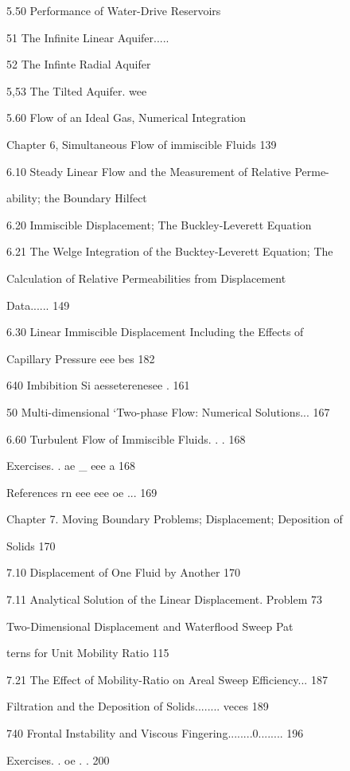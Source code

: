 \documentclass[
  11pt,
]{article}
\begin{document}
5.50 Performance of Water-Drive Reservoirs\par
51 The Infinite Linear Aquifer.....\par
52 The Infinte Radial Aquifer\par
5,53 The Tilted Aquifer. wee\par
5.60 Flow of an Ideal Gas, Numerical Integration\par
\smallskip
Chapter 6, Simultaneous Flow of immiscible Fluids 139\par
6.10 Steady Linear Flow and the Measurement of Relative Perme-\par
ability; the Boundary Hilfect\par
6.20 Immiscible Displacement; The Buckley-Leverett Equation\par
6.21 The Welge Integration of the Bucktey-Leverett Equation; The\par
Calculation of Relative Permeabilities from Displacement\par
\smallskip
Data...... 149\par
6.30 Linear Immiscible Displacement Including the Effects of\par
Capillary Pressure eee bes 182\par
640 Imbibition Si aesseterenesee . 161\par
50 Multi-dimensional `Two-phase Flow: Numerical Solutions... 167\par
6.60 Turbulent Flow of Immiscible Fluids. . . 168\par
Exercises. . ae \_ eee a 168\par
References rn eee eee oe ... 169\par
Chapter 7. Moving Boundary Problems; Displacement; Deposition of\par
Solids 170\par
7.10 Displacement of One Fluid by Another 170\par
7.11 Analytical Solution of the Linear Displacement. Problem 73\par
{} Two-Dimensional Displacement and Waterflood Sweep Pat\par
terns for Unit Mobility Ratio 115\par
7.21 The Effect of Mobility-Ratio on Areal Sweep Efficiency... 187\par
{} Filtration and the Deposition of Solids........ veces 189\par
740 Frontal Instability and Viscous Fingering........0........ 196\par
Exercises. . oe . . 200\par
\end{document}
